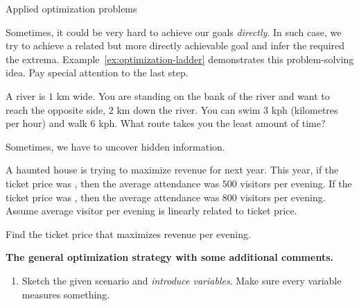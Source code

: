 \documentclass[../main.tex]{subfiles}
\begin{document}
\begin{lesson}{Applied optimization problems}
\begin{example}
    \clearpage
  \end{example}


  Sometimes, it could be very hard to achieve our goals \emph{directly}. In such case, we try to achieve a related but more directly achievable goal and infer the required the extrema. Example~\ref{ex:optimization-ladder} demonstrates this problem-solving idea. Pay special attention to the last step.
  \begin{example} \label{ex:optimization-swim}
    A  river is \(1\) km wide. You are standing on the bank of the river and want to reach the opposite side, \(2\) km down the river. You can swim \(3\) kph (kilometres per hour) and walk \(6\) kph. What route takes you the least amount of time?

    \hfill{}
  \end{example}

  Sometimes, we have to uncover hidden information. 

  \begin{example}
    A haunted house is trying to maximize revenue for next year. This year, if the ticket price was , then the average attendance was \(500\) visitors per evening. If the ticket price was , then the average attendance was \(800\) visitors per evening.  Assume average visitor per evening is linearly related to ticket price.

    Find the ticket price that maximizes revenue per evening. 
  \end{example}
  \clearpage

  \textbf{The general optimization strategy with some additional comments.}
  \label{page:optimization-strategy}
  \begin{enumerate}[label=(\arabic*)]
    \item Sketch the given scenario and \emph{introduce variables}. Make sure every variable measures something.


\end{enumerate}
\end{lesson}
\end{document}
